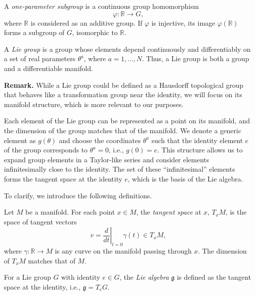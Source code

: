 \begin{definition}
A \emph{one-parameter subgroup} is a continuous group homomorphism
\[
\varphi : \mathbb{R} \to G,
\]
where $\mathbb{R}$ is considered as an additive group. If $\varphi$ is injective, its image $\varphi(\mathbb{R})$ forms a subgroup of $G$, isomorphic to $\mathbb{R}$.
\end{definition}

\begin{definition}
A \emph{Lie group} is a group whose elements depend continuously and differentiably on a set of real parameters $\theta^a$, where $a = 1, \dots, N$. Thus, a Lie group is both a group and a differentiable manifold.
\end{definition}

\noindent
\textbf{Remark.} While a Lie group could be defined as a Hausdorff topological group that behaves like a transformation group near the identity, we will focus on its manifold structure, which is more relevant to our purposes.

\noindent
Each element of the Lie group can be represented as a point on its manifold, and the dimension of the group matches that of the manifold. We denote a generic element as $g(\theta)$ and choose the coordinates $\theta^a$ such that the identity element $e$ of the group corresponds to $\theta^a = 0$, i.e., $g(0) = e$. This structure allows us to expand group elements in a Taylor-like series and consider elements infinitesimally close to the identity. The set of these “infinitesimal” elements forms the tangent space at the identity $e$, which is the basis of the Lie algebra. 

To clarify, we introduce the following definitions.

\begin{definition}
Let $M$ be a manifold. For each point $x \in M$, the \emph{tangent space} at $x$, $T_xM$, is the space of tangent vectors
\[
v = \left. \frac{d}{dt} \right|_{t=0} \gamma(t) \in T_xM,
\]
where $\gamma : \mathbb{R} \to M$ is any curve on the manifold passing through $x$. The dimension of $T_xM$ matches that of $M$.
\end{definition}

\begin{definition}
For a Lie group $G$ with identity $e \in G$, the \emph{Lie algebra} $\mathfrak{g}$ is defined as the tangent space at the identity, i.e., $\mathfrak{g} = T_eG$.
\end{definition}

